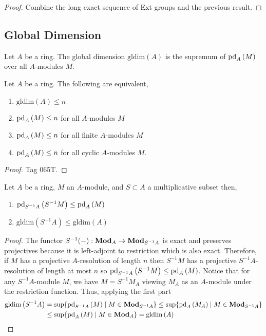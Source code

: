 \documentclass[12pt]{article}
\begin{document}
\begin{proof}
Combine the long exact sequence of Ext groups and the previous result.
\end{proof}

\subsection{Global Dimension}

\newcommand{\gldim}[1]{\mathrm{gldim}\left( #1 \right)}

\begin{defn}
Let $A$ be a ring. The global dimension $\gldim{A}$ is the supremum of $\mathrm{pd}_{A} \left( M \right)$ over all $A$-modules $M$.
\end{defn}

\begin{theorem}
Let $A$ be a ring. The following are equivalent,
\begin{enumerate}
\item $\gldim{A} \le n$
\item $\mathrm{pd}_{A} \left( M \right) \le n$ for all $A$-modules $M$
\item $\mathrm{pd}_{A} \left( M \right) \le n$ for all finite $A$-modules $M$
\item $\mathrm{pd}_{A} \left( M \right) \le n$ for all cyclic $A$-modules $M$.
\end{enumerate}
\end{theorem}

\begin{proof}
Tag 065T.
\end{proof}

\begin{lemma}
Let $A$ be a ring, $M$ an $A$-module, and $S \subset A$ a multiplicative subset then,
\begin{enumerate}
\item $\mathrm{pd}_{S^{-1}A} \left( S^{-1} M \right) \le \mathrm{pd}_{A} \left( M \right)$
\item $\gldim{S^{-1} A} \le \gldim{A}$
\end{enumerate}
\end{lemma}

\begin{proof}
The functor $S^{-1}(-) : \mathbf{Mod}_{A} \to \mathbf{Mod}_{S^{-1} A}$ is exact and preserves projectives because it is left-adjoint to restriction which is also exact. Therefore, if $M$ has a projective $A$-resolution of length $n$ then $S^{-1} M$ has a projective $S^{-1} A$-resolution of length at most $n$ so $\mathrm{pd}_{S^{-1} A} \left( S^{-1} M \right) \le \mathrm{pd}_{A} \left( M \right)$. Notice that for any $S^{-1} A$-module $M$, we have $M = S^{-1} M_A$ viewing $M_A$ as an $A$-module under the restriction function. Thus, applying the first part
\begin{align*}
\gldim{S^{-1} A} & = \sup \{ \pd{S^{-1} A}{M} \mid M \in \Mod{S^{-1} A} \} \le \sup \{ \pd{A}{M_A} \mid M \in \Mod{S^{-1} A} \} 
\\
& \le \sup \{ \pd{A}{M} \mid M \in \Mod{A} \} = \gldim{A} 
\end{align*}
\end{proof}
\end{document}
